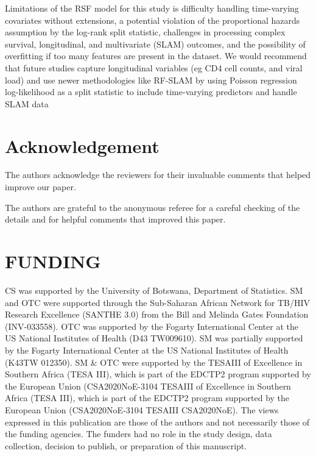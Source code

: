 \documentclass[10pt]{NSP1}
\begin{document}
Limitations of the RSF model for this study is difficulty handling time-varying covariates without extensions, a potential violation of the proportional hazards assumption by the log-rank split statistic, challenges in processing complex survival, longitudinal, and multivariate (SLAM) outcomes, and the possibility of overfitting if too many features are present in the dataset. We would recommend that future studies capture longitudinal variables (eg CD4 cell counts, and viral load) and use newer methodologies like RF-SLAM by using Poisson regression log-likelihood as a split statistic to include time-varying predictors and handle SLAM data


\section*{Acknowledgement}
The authors acknowledge the reviewers for their invaluable comments that helped improve our paper.

\noindent The authors are grateful to the anonymous referee for a careful
checking of the details and for helpful comments that improved this
paper.

\section*{FUNDING}
CS was supported by the University of Botswana, Department of Statistics. SM and OTC were supported through the Sub-Saharan African Network for TB/HIV Research Excellence (SANTHE 3.0) from the Bill and Melinda Gates Foundation (INV-033558). OTC was supported by the Fogarty International Center at the US National Institutes of Health (D43 TW009610). SM was partially supported by the Fogarty International Center at the US National Institutes of Health (K43TW 012350). SM \& OTC were supported by the TESAIII of Excellence in Southern Africa (TESA III), which is part of the EDCTP2 program supported by the European Union (CSA2020NoE-3104 TESAIII of Excellence in Southern Africa (TESA III), which is part of the EDCTP2 program supported by the European Union (CSA2020NoE-3104 TESAIII CSA2020NoE). The views expressed in this publication are those of the authors and not necessarily those of the funding agencies. The funders had no role in the study design, data collection, decision to publish, or preparation of this manuscript.
\end{document}
